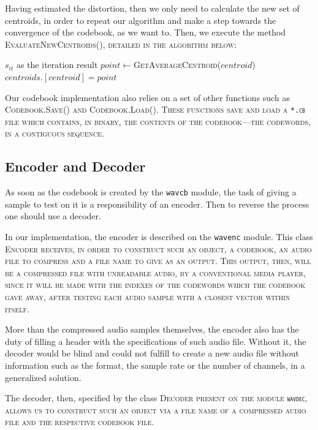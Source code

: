 \documentclass[conference]{IEEEtran}
\begin{document}
Having estimated the distortion, then we only need to calculate the new set of centroids, in order to repeat our algorithm and make a step towards the convergence of the codebook, as we want to. Then, we execute the method \scshape{EvaluateNewCentroids()}\upshape, detailed in the algorithm below:

\begin{algorithmic}[1]
	\REQUIRE $s_{it}$ as the iteration result
		\STATE $point \leftarrow $\scshape{GetAverageCentroid($centroid$)}\upshape
		\STATE $centroids.\left[centroid\right]=point$
	\ENDFOR
\end{algorithmic}

Our codebook implementation also relies on a set of other functions such as \scshape{Codebook.Save()} \upshape and \scshape{Codebook.Load()}\upshape. These functions save and load a \texttt{*.cb} file which contains, in binary, the contents of the codebook—the codewords, in a contiguous sequence.

\subsection{Encoder and Decoder}

As soon as the codebook is created by the \texttt{wavcb} module, the task of giving a sample to test on it is a responsibility of an encoder. Then to reverse the process one should use a decoder. 

In our implementation, the encoder is described on the \texttt{wavenc} module. This class \scshape{Encoder} \upshape receives, in order to construct such an object, a codebook, an audio file to compress and a file name to give as an output. This output, then, will be a compressed file with unreadable audio, by a conventional media player, since it will be made with the indexes of the codewords which the codebook gave away, after testing each audio sample with a closest vector within itself.

More than the compressed audio samples themselves, the encoder also has the duty of filling a header with the specifications of such audio file. Without it, the decoder would be blind and could not fulfill to create a new audio file without information such as the format, the sample rate or the number of channels, in a generalized solution.

The decoder, then, specified by the class \scshape{Decoder} \upshape present on the module \texttt{wavdec}, allows us to construct such an object via a file name of a compressed audio file and the respective codebook file.
\end{document}
